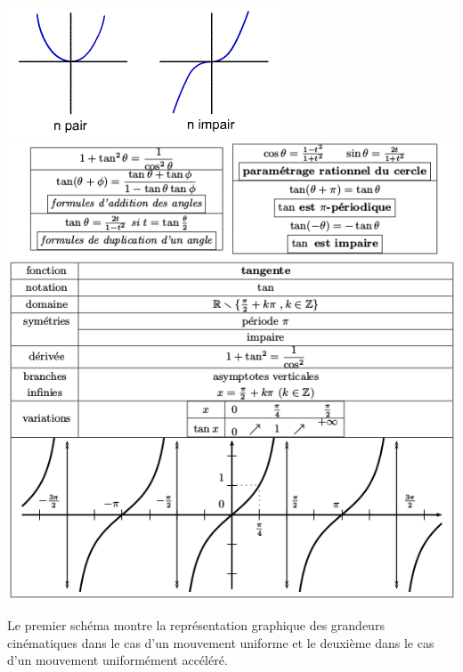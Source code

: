 \documentclass[a4paper,10pt]{book}
\begin{document}
\includegraphics[scale=0.6]{images/008.png}
\includegraphics[scale=0.47]{images/009.png}

Le premier schéma montre la représentation graphique des grandeurs cinématiques dans le cas d'un mouvement uniforme et le deuxième dans le cas d'un mouvement uniformément accéléré.
\end{document}
